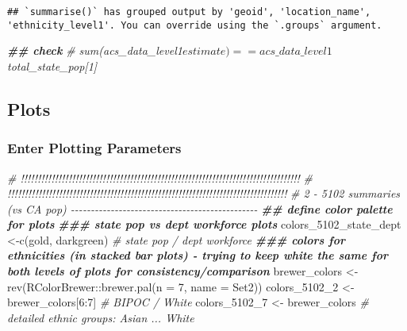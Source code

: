 \documentclass[
]{article}
\newenvironment{Shaded}{\begin{snugshade}}{\end{snugshade}}
\newcommand{\AttributeTok}[1]{\textcolor[rgb]{0.77,0.63,0.00}{#1}}
\newcommand{\CommentTok}[1]{\textcolor[rgb]{0.56,0.35,0.01}{\textit{#1}}}
\newcommand{\DecValTok}[1]{\textcolor[rgb]{0.00,0.00,0.81}{#1}}
\newcommand{\DocumentationTok}[1]{\textcolor[rgb]{0.56,0.35,0.01}{\textbf{\textit{#1}}}}
\newcommand{\FunctionTok}[1]{\textcolor[rgb]{0.00,0.00,0.00}{#1}}
\newcommand{\NormalTok}[1]{#1}
\newcommand{\OtherTok}[1]{\textcolor[rgb]{0.56,0.35,0.01}{#1}}
\newcommand{\SpecialCharTok}[1]{\textcolor[rgb]{0.00,0.00,0.00}{#1}}
\newcommand{\StringTok}[1]{\textcolor[rgb]{0.31,0.60,0.02}{#1}}
\begin{document}
\begin{verbatim}
## `summarise()` has grouped output by 'geoid', 'location_name', 'ethnicity_level1'. You can override using the `.groups` argument.
\end{verbatim}

\begin{Shaded}
\begin{Highlighting}[]
    \DocumentationTok{\#\# check }
    \CommentTok{\# sum(acs\_data\_level1$estimate) == acs\_data\_level1$total\_state\_pop[1]}
\end{Highlighting}
\end{Shaded}

\hypertarget{plots}{%
\subsection{Plots}\label{plots}}

\hypertarget{enter-plotting-parameters}{%
\subsubsection{Enter Plotting
Parameters}\label{enter-plotting-parameters}}

\begin{Shaded}
\begin{Highlighting}[]
\CommentTok{\# !!!!!!!!!!!!!!!!!!!!!!!!!!!!!!!!!!!!!!!!!!!!!!!!!!!!!!!!!!!!!!!!!!!!!!!!!!!!!!!!!!}
\CommentTok{\# !!!!!!!!!!!!!!!!!!!!!!!!!!!!!!!!!!!!!!!!!!!!!!!!!!!!!!!!!!!!!!!!!!!!!!!!!!!!!!!!!!}
\CommentTok{\# 2 {-} 5102 summaries (vs CA pop) {-}{-}{-}{-}{-}{-}{-}{-}{-}{-}{-}{-}{-}{-}{-}{-}{-}{-}{-}{-}{-}{-}{-}{-}{-}{-}{-}{-}{-}{-}{-}{-}{-}{-}{-}{-}{-}{-}{-}{-}{-}{-}{-}{-}{-}{-}{-}}
\DocumentationTok{\#\# define color palette for plots}
\DocumentationTok{\#\#\# state pop vs dept workforce plots}
\NormalTok{colors\_5102\_state\_dept }\OtherTok{\textless{}{-}}\FunctionTok{c}\NormalTok{(}\StringTok{\textquotesingle{}gold\textquotesingle{}}\NormalTok{, }\StringTok{\textquotesingle{}darkgreen\textquotesingle{}}\NormalTok{) }\CommentTok{\# state pop / dept workforce}
\DocumentationTok{\#\#\# colors for ethnicities (in stacked bar plots) {-} trying to keep \textquotesingle{}white\textquotesingle{} the same for both levels of plots for consistency/comparison}
\NormalTok{brewer\_colors }\OtherTok{\textless{}{-}} \FunctionTok{rev}\NormalTok{(RColorBrewer}\SpecialCharTok{::}\FunctionTok{brewer.pal}\NormalTok{(}\AttributeTok{n =} \DecValTok{7}\NormalTok{, }\AttributeTok{name =} \StringTok{\textquotesingle{}Set2\textquotesingle{}}\NormalTok{))}
\NormalTok{colors\_5102\_2 }\OtherTok{\textless{}{-}}\NormalTok{ brewer\_colors[}\DecValTok{6}\SpecialCharTok{:}\DecValTok{7}\NormalTok{] }\CommentTok{\# BIPOC / White}
\NormalTok{colors\_5102\_7 }\OtherTok{\textless{}{-}}\NormalTok{ brewer\_colors }\CommentTok{\# detailed ethnic groups: Asian ... White}
\end{Highlighting}
\end{Shaded}
\end{document}
